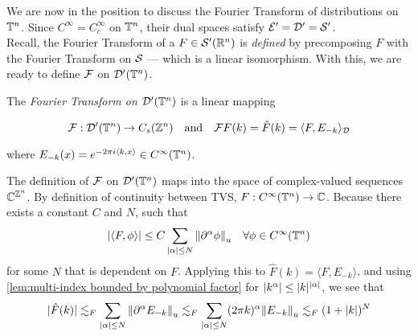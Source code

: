 \documentclass[../main-v2-manifolds.tex]{subfiles}
\begin{document}
We are now in the position to discuss the Fourier Transform of distributions on ${\mathbb{T}^n}$. Since $C^\infty =  C_c^\infty$ on ${\mathbb{T}^n}$, their dual spaces satisfy $\mathcal{E}' = \mathcal{D}' = \mathcal{S}'$. \\

Recall, the Fourier Transform of a $F\in\mathcal{S}'({\mathbb{R}^n})$ is \emph{defined} by precomposing $F$ with the Fourier Transform on $\mathcal{S}$ --- which is a linear isomorphism. With this, we are ready to define $\mathcal{F}$ on $\mathcal{D}'({\mathbb{T}^n})$.

\begin{definition}
The \emph{Fourier Transform on $\mathcal{D}'({\mathbb{T}^n})$} is a linear mapping

\[
\fourier: \dzz'(\Torusn)\to C_s(\mathbb{Z}^n)\qqtext{and}\fourier{F}(k)=\hat{F}(k)=\langle F, E_{-k}\rangle_{\dzz}
\]

where $E_{-k}(x) = e^{-2\pi i\langle k,x\rangle}\in C^\infty({\mathbb{T}^n})$.
\end{definition}
\begin{remark}
The definition of $\mathcal{F}$ on $\mathcal{D}'({\mathbb{T}^n})$ maps into the space of complex-valued sequences ${\mathbb{C}}^{\mathbb{Z}^n}$. By definition of continuity between TVS, $F: C^\infty({\mathbb{T}^n})\to\mathbb{C}$. Because there exists a constant $C$ and $N$, such that 
\[
\vert \langle F,\phi\rangle\vert \leq C\sum_{\vert {\alpha} \vert\leq N}\norm{\partial^\alpha \phi}_u\quad\forall \phi\in C^\infty({\mathbb{T}^n})
\]
for some $N$ that is dependent on $F$. Applying this to $\hat{F}(k) = \langle F,E_{-k}\rangle$, and using \cref{lem:multi-index bounded by polynomial factor} for $\vert {k^\alpha} \vert\leq\vert {k} \vert^{\vert {\alpha} \vert}$, we see that
\[
\vert\hat{F}(k)\vert\lesssim_F \sum_{\vert {\alpha} \vert\leq N}\norm{\partial^\alpha E_{-k}}_u\lesssim_F \sum_{\vert {\alpha} \vert\leq N}(2\pi k)^{\alpha}\norm{E_{-k}}_u\lesssim_F (1+\vert {k} \vert)^N
\]
\end{remark}
\end{document}
